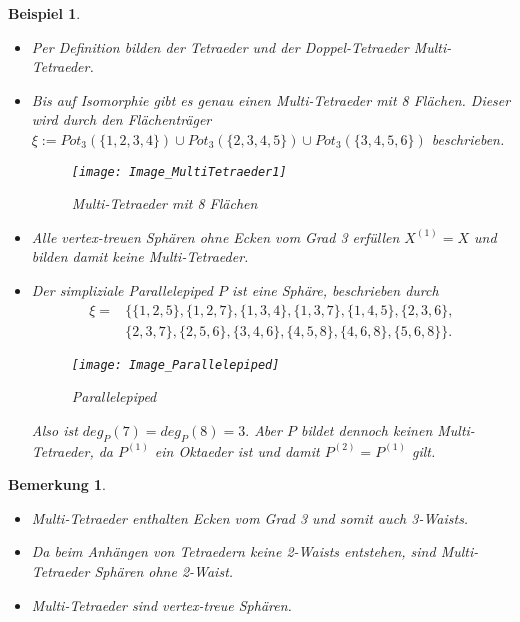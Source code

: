 \documentclass[12pt,titlepage,twoside,cleardoublepage]{article}
\theoremstyle{nummermitklammern}
\newtheorem{bsp}[temp]{Beispiel}
\newtheorem{bemerkung}[temp]{Bemerkung}
\newtheorem{bsp}[zahl]{Beispiel}
\newtheorem{bemerkung}[zahl]{Bemerkung}
\numberwithin{equation}{section}
\begin{document}
\begin{bsp} \label{bspCactus}
\begin{itemize}
\item Per Definition bilden der Tetraeder und der Doppel-Tetraeder Multi-Tetraeder.
\item Bis auf Isomorphie gibt es genau einen Multi-Tetraeder mit 8 Flächen. Dieser wird durch den Flächenträger $\xi:=Pot_3(\{1,2,3,4\})\cup Pot_3(\{2,3,4,5\})\cup Pot_3(\{3,4,5,6\})$ beschrieben. 
\begin{figure}[H]
\begin{center}
\texttt{[image: Image\_MultiTetraeder1]}
\end{center}
\caption{Multi-Tetraeder mit 8 Flächen}
\end{figure}
\item Alle vertex-treuen Sphären ohne Ecken vom Grad 3 erfüllen $X^{(1)}=X$ und bilden damit keine Multi-Tetraeder.
\item Der simpliziale Parallelepiped $P$ ist eine Sphäre, beschrieben durch 
\begin{align*}
\xi=&\{ \{1, 2, 5 \}, \{ 1, 2, 7 \}, \{ 1, 3, 4 \}, \{ 1, 3, 7 \}, \{ 1, 4, 5 \},\{ 2, 3, 6 \},\\ &\{2, 3, 7 \}, 
\{ 2, 5, 6 \}, \{ 3, 4, 6 \}, \{ 4, 5, 8 \},\{ 4, 6, 8 \}, \{ 5, 6, 8 \} \}.
\end{align*}
\begin{figure}[H]
\begin{center}
\texttt{[image: Image\_Parallelepiped]}
\end{center}
\caption{Parallelepiped}
\end{figure}
Also ist $deg_P(7)=deg_P(8)=3.$ Aber $P$ bildet dennoch keinen Multi-Tetraeder, da $P^{(1)}$ ein Oktaeder ist und damit $P^{(2)}=P^{(1)}$ gilt.
\end{itemize}
\end{bsp}
\begin{bemerkung}
\begin{itemize}
\item Multi-Tetraeder enthalten Ecken vom Grad 3 und somit auch 3-Waists.

\item
Da beim Anhängen von Tetraedern keine 2-Waists entstehen, sind Multi-Tetraeder Sphären ohne 2-Waist.
\item
Multi-Tetraeder sind vertex-treue Sphären.
\end{itemize}
\end{bemerkung}
\end{document}
